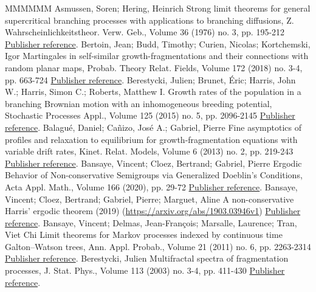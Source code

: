 \begin{thebibliography}{MMMMMM}
 Asmussen, Soren; Hering, Heinrich Strong limit theorems for general supercritical branching processes with applications to branching diffusions, Z. Wahrscheinlichkeitstheor. Verw. Geb., Volume 36 (1976) no. 3, pp. 195-212 \href{https://ahl.centre-mersenne.org/item/AHL_2020__3__795_0/#AsHer}{Publisher reference}.
 Bertoin, Jean; Budd, Timothy; Curien, Nicolas; Kortchemski, Igor Martingales in self-similar growth-fragmentations and their connections with random planar maps, Probab. Theory Relat. Fields, Volume 172 (2018) no. 3-4, pp. 663-724 \href{https://ahl.centre-mersenne.org/item/AHL_2020__3__795_0/#BBCK}{Publisher reference}.
 Berestycki, Julien; Brunet, Éric; Harris, John W.; Harris, Simon C.; Roberts, Matthew I. Growth rates of the population in a branching Brownian motion with an inhomogeneous breeding potential, Stochastic Processes Appl., Volume 125 (2015) no. 5, pp. 2096-2145 \href{https://ahl.centre-mersenne.org/item/AHL_2020__3__795_0/#BBHHR}{Publisher reference}.
 Balagué, Daniel; Cañizo, José A.; Gabriel, Pierre Fine asymptotics of profiles and relaxation to equilibrium for growth-fragmentation equations with variable drift rates, Kinet. Relat. Models, Volume 6 (2013) no. 2, pp. 219-243 \href{https://ahl.centre-mersenne.org/item/AHL_2020__3__795_0/#BCG-fine}{Publisher reference}.
 Bansaye, Vincent; Cloez, Bertrand; Gabriel, Pierre Ergodic Behavior of Non-conservative Semigroups via Generalized Doeblin’s Conditions, Acta Appl. Math., Volume 166 (2020), pp. 29-72 \href{https://ahl.centre-mersenne.org/item/AHL_2020__3__795_0/#BanCloGab}{Publisher reference}.
 Bansaye, Vincent; Cloez, Bertrand; Gabriel, Pierre; Marguet, Aline A non-conservative Harris’ ergodic theorem (2019) (\url{https://arxiv.org/abs/1903.03946v1}) \href{https://ahl.centre-mersenne.org/item/AHL_2020__3__795_0/#BCGM-qs}{Publisher reference}.
 Bansaye, Vincent; Delmas, Jean-François; Marsalle, Laurence; Tran, Viet Chi Limit theorems for Markov processes indexed by continuous time Galton–Watson trees, Ann. Appl. Probab., Volume 21 (2011) no. 6, pp. 2263-2314 \href{https://ahl.centre-mersenne.org/item/AHL_2020__3__795_0/#BDMT}{Publisher reference}.
 Berestycki, Julien Multifractal spectra of fragmentation processes, J. Stat. Phys., Volume 113 (2003) no. 3-4, pp. 411-430 \href{https://ahl.centre-mersenne.org/item/AHL_2020__3__795_0/#Beresty}{Publisher reference}.

\end{thebibliography}
